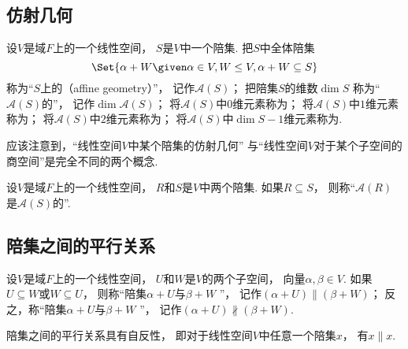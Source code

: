 \subsection{仿射几何}
\begin{definition}
设\(V\)是域\(F\)上的一个线性空间，
\(S\)是\(V\)中一个陪集.
把\(S\)中全体陪集\begin{equation*}
	\Set{
		\alpha + W
		\given
		\alpha \in V,
		W \AlgebraSubstructure V,
		\alpha + W \subseteq S
	}
\end{equation*}
称为“\(S\)上的（affine geometry）”，
记作\(\mathcal{A}(S)\)；
把陪集\(S\)的维数\(\dim S\)
称为“\(\mathcal{A}(S)\)的”，
记作\(\dim\mathcal{A}(S)\)；
将\(\mathcal{A}(S)\)中\(0\)维元素称为；
将\(\mathcal{A}(S)\)中\(1\)维元素称为；
将\(\mathcal{A}(S)\)中\(2\)维元素称为；
将\(\mathcal{A}(S)\)中\(\dim S-1\)维元素称为.
\end{definition}
\begin{remark}
应该注意到，“线性空间\(V\)中某个陪集的仿射几何”
与“线性空间\(V\)对于某个子空间的商空间”是完全不同的两个概念.
\end{remark}

\begin{definition}
设\(V\)是域\(F\)上的一个线性空间，
\(R\)和\(S\)是\(V\)中两个陪集.
如果\(R \subseteq S\)，
则称“\(\mathcal{A}(R)\)是\(\mathcal{A}(S)\)的”.
\end{definition}

\subsection{陪集之间的平行关系}
\begin{definition}
设\(V\)是域\(F\)上的一个线性空间，
\(U\)和\(W\)是\(V\)的两个子空间，
向量\(\alpha,\beta \in V\).
如果\(U \subseteq W\)或\(W \subseteq U\)，
则称“陪集\(\alpha + U\)与\(\beta + W\) ”，
记作\((\alpha + U) \parallel (\beta + W)\)；
反之，称“陪集\(\alpha + U\)与\(\beta + W\) ”，
记作\((\alpha + U) \nparallel (\beta + W)\).
\end{definition}

\begin{property}
陪集之间的平行关系具有自反性，
即对于线性空间\(V\)中任意一个陪集\(x\)，
有\(x \parallel x\).
\end{property}

